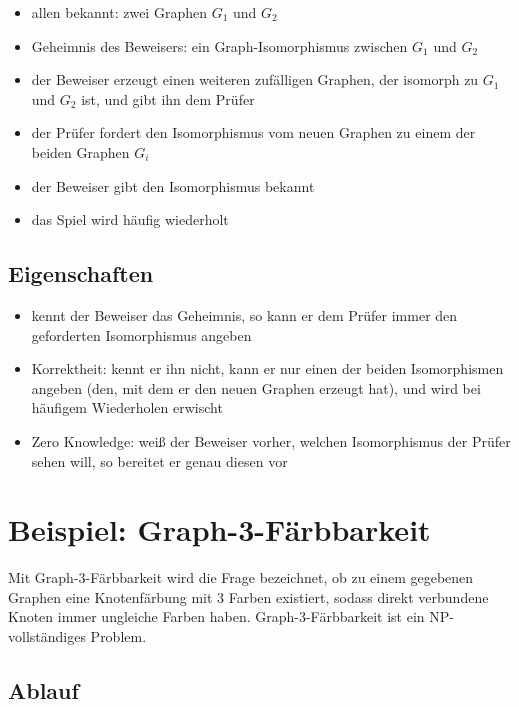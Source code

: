\documentclass[a4paper,twoside,DIV15,BCOR12mm]{scrbook}
\begin{document}
\begin{itemize}
	\item allen bekannt: zwei Graphen $G_1$ und $G_2$
	\item Geheimnis des Beweisers: ein Graph-Isomorphismus zwischen $G_1$ und $G_2$
	\item der Beweiser erzeugt einen weiteren zufälligen Graphen, der isomorph zu $G_1$ und $G_2$ ist, und gibt ihn dem Prüfer
	\item der Prüfer fordert den Isomorphismus vom neuen Graphen zu einem der beiden Graphen $G_i$
	\item der Beweiser gibt den Isomorphismus bekannt
	\item das Spiel wird häufig wiederholt
\end{itemize}

\subsection{Eigenschaften}

\begin{itemize}
	\item kennt der Beweiser das Geheimnis, so kann er dem Prüfer immer den geforderten Isomorphismus angeben
	\item Korrektheit: kennt er ihn nicht, kann er nur einen der beiden Isomorphismen angeben (den, mit dem er den neuen Graphen erzeugt hat), und wird bei häufigem Wiederholen erwischt
	\item Zero Knowledge: weiß der Beweiser vorher, welchen Isomorphismus der Prüfer sehen will, so bereitet er genau diesen vor
\end{itemize}

\section{Beispiel: Graph-3-Färbbarkeit}

Mit Graph-3-Färbbarkeit wird die Frage bezeichnet, ob zu einem gegebenen Graphen eine Knotenfärbung mit 3 Farben existiert, sodass direkt verbundene Knoten immer ungleiche Farben haben. Graph-3-Färbbarkeit ist ein NP-vollständiges Problem.

\subsection{Ablauf}
\end{document}
